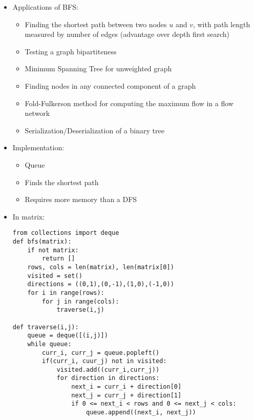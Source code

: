 \documentclass[a4paper, 11.25pt]{article}
\begin{document}
\begin{itemize}
    \item Applications of BFS:
    \begin{itemize}
        \item Finding the shortest path between two nodes $u$ and $v$, with path length measured by number of edges (advantage over depth first search)
        \item Testing a graph bipartiteness
        \item Minimum Spanning Tree for unweighted graph
        \item Finding nodes in any connected component of a graph
        \item Fold-Fulkerson method for computing the maximum flow in a flow network
        \item Serialization/Deserialization of a binary tree
    \end{itemize}
    \item Implementation:
    \begin{itemize}
        \item Queue
        \item Finds the shortest path
        \item Requires more memory than a DFS
    \end{itemize}
    \item In matrix:
    \begin{lstlisting}[style=PythonStyle]
from collections import deque
def bfs(matrix):
    if not matrix:
        return []
    rows, cols = len(matrix), len(matrix[0])
    visited = set()
    directions = ((0,1),(0,-1),(1,0),(-1,0))
    for i in range(rows):
        for j in range(cols):
            traverse(i,j)
    
def traverse(i,j):
    queue = deque([(i,j)])
    while queue:
        curr_i, curr_j = queue.popleft()
        if(curr_i, cuur_j) not in visited:
            visited.add((curr_i,curr_j))
            for direction in directions:
                next_i = curr_i + direction[0]
                next_j = curr_j + direction[1]
                if 0 <= next_i < rows and 0 <= next_j < cols:
                    queue.append((next_i, next_j))\end{lstlisting}       
\end{itemize}
\end{document}

